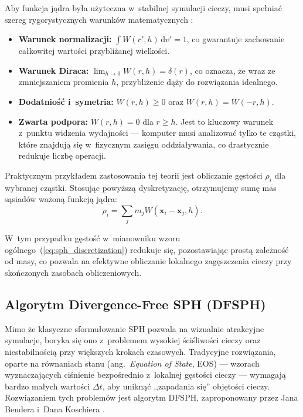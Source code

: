 Aby funkcja jądra była użyteczna w~stabilnej symulacji cieczy, musi spełniać szereg rygorystycznych warunków matematycznych \cite{koschier2020smoothed}:
\begin{itemize}
    \item \textbf{Warunek normalizacji:} $\int W(r', h) \,\mathrm{d}v' = 1$, co gwarantuje zachowanie całkowitej wartości przybliżanej wielkości.
    \item \textbf{Warunek Diraca:} $\lim_{h \to 0} W(r, h) = \delta(r)$, co oznacza, że wraz ze zmniejszaniem promienia $h$, przybliżenie dąży do rozwiązania idealnego.
    \item \textbf{Dodatniość i~symetria:} $W(r, h) \ge 0$ oraz $W(r, h) = W(-r, h)$.
    \item \textbf{Zwarta podpora:} $W(r, h) = 0$ dla $r \ge h$. Jest to kluczowy warunek z~punktu widzenia wydajności --- komputer musi analizować tylko te cząstki, które znajdują się w~fizycznym zasięgu oddziaływania, co drastycznie redukuje liczbę operacji.
\end{itemize}

Praktycznym przykładem zastosowania tej teorii jest obliczanie gęstości $\rho_i$ dla wybranej cząstki. Stosując powyższą dyskretyzację, otrzymujemy sumę mas sąsiadów ważoną funkcją jądra:
\begin{equation}
    \rho_i = \sum_{j} m_j W(\mathbf{x}_i - \mathbf{x}_j, h).
\end{equation}

W~tym przypadku gęstość w~mianowniku wzoru ogólnego~(\ref{eq:sph_discretization}) redukuje się, pozostawiając prostą zależność od masy, co pozwala na efektywne obliczanie lokalnego zagęszczenia cieczy przy skończonych zasobach obliczeniowych.

\subsection{Algorytm Divergence-Free SPH (DFSPH)}
\label{subsec:dfsph}

Mimo że klasyczne sformułowanie SPH pozwala na wizualnie atrakcyjne symulacje, 
boryka się ono z~problemem wysokiej ściśliwości cieczy oraz niestabilnością przy 
większych krokach czasowych. Tradycyjne rozwiązania, oparte na równaniach stanu (ang.~\textit{Equation of State}, EOS) ---
wzorach wyznaczających ciśnienie bezpośrednio z~lokalnej gęstości cieczy ---
wymagają bardzo małych wartości $\Delta t$, aby uniknąć ,,zapadania się'' objętości cieczy. 
Rozwiązaniem tych problemów jest algorytm DFSPH, 
zaproponowany przez Jana Bendera i~Dana Koschiera \cite{bender2015divergence}.


